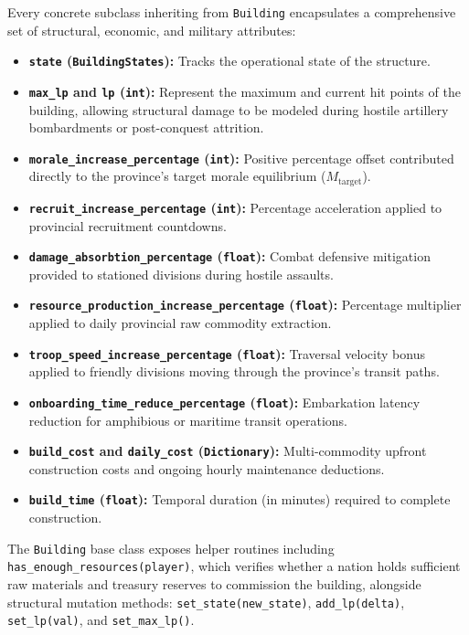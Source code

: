Every concrete subclass inheriting from \texttt{Building} encapsulates a comprehensive set of structural, economic, and military attributes:
\begin{itemize}
    \item \textbf{\texttt{state} (\texttt{BuildingStates}):} Tracks the operational state of the structure.
    \item \textbf{\texttt{max\_lp} and \texttt{lp} (\texttt{int}):} Represent the maximum and current hit points of the building, allowing structural damage to be modeled during hostile artillery bombardments or post-conquest attrition.
    \item \textbf{\texttt{morale\_increase\_percentage} (\texttt{int}):} Positive percentage offset contributed directly to the province's target morale equilibrium ($M_{\text{target}}$).
    \item \textbf{\texttt{recruit\_increase\_percentage} (\texttt{int}):} Percentage acceleration applied to provincial recruitment countdowns.
    \item \textbf{\texttt{damage\_absorbtion\_percentage} (\texttt{float}):} Combat defensive mitigation provided to stationed divisions during hostile assaults.
    \item \textbf{\texttt{resource\_production\_increase\_percentage} (\texttt{float}):} Percentage multiplier applied to daily provincial raw commodity extraction.
    \item \textbf{\texttt{troop\_speed\_increase\_percentage} (\texttt{float}):} Traversal velocity bonus applied to friendly divisions moving through the province's transit paths.
    \item \textbf{\texttt{onboarding\_time\_reduce\_percentage} (\texttt{float}):} Embarkation latency reduction for amphibious or maritime transit operations.
    \item \textbf{\texttt{build\_cost} and \texttt{daily\_cost} (\texttt{Dictionary}):} Multi-commodity upfront construction costs and ongoing hourly maintenance deductions.
    \item \textbf{\texttt{build\_time} (\texttt{float}):} Temporal duration (in minutes) required to complete construction.
\end{itemize}

The \texttt{Building} base class exposes helper routines including \texttt{has\_enough\_resources(player)}, which verifies whether a nation holds sufficient raw materials and treasury reserves to commission the building, alongside structural mutation methods: \texttt{set\_state(new\_state)}, \texttt{add\_lp(delta)}, \texttt{set\_lp(val)}, and \texttt{set\_max\_lp()}.

